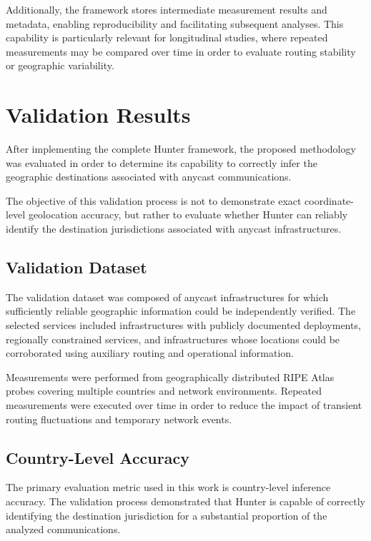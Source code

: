 Additionally, the framework stores intermediate measurement results and metadata, enabling reproducibility and facilitating subsequent analyses. This capability is particularly relevant for longitudinal studies, where repeated measurements may be compared over time in order to evaluate routing stability or geographic variability.

\section{Validation Results}
\label{sc:hunter_validation_results}

After implementing the complete Hunter framework, the proposed methodology was evaluated in order to determine its capability to correctly infer the geographic destinations associated with anycast communications.

The objective of this validation process is not to demonstrate exact coordinate-level geolocation accuracy, but rather to evaluate whether Hunter can reliably identify the destination jurisdictions associated with anycast infrastructures.

\subsection{Validation Dataset}

The validation dataset was composed of anycast infrastructures for which sufficiently reliable geographic information could be independently verified. The selected services included infrastructures with publicly documented deployments, regionally constrained services, and infrastructures whose locations could be corroborated using auxiliary routing and operational information.

Measurements were performed from geographically distributed RIPE Atlas probes covering multiple countries and network environments. Repeated measurements were executed over time in order to reduce the impact of transient routing fluctuations and temporary network events.

\subsection{Country-Level Accuracy}

The primary evaluation metric used in this work is country-level inference accuracy. The validation process demonstrated that Hunter is capable of correctly identifying the destination jurisdiction for a substantial proportion of the analyzed communications.

